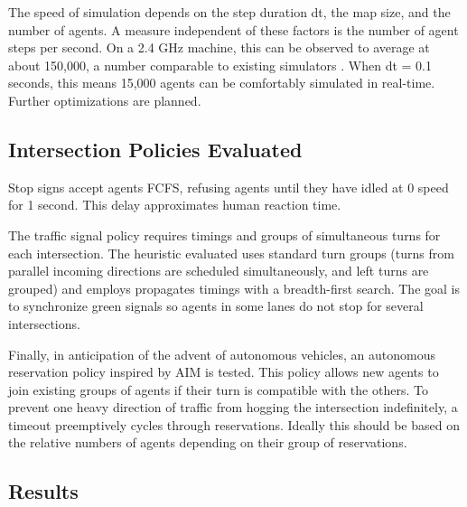 \documentclass[letterpaper, 10 pt, conference]{ieeeconf}  %
\begin{document}
The speed of simulation depends on the step duration dt, the map size, and the
number of agents. A measure independent of these factors is the number of agent
steps per second. On a 2.4 GHz machine, this can be observed to average at about
150,000, a number comparable to existing simulators \cite{SUMOthesis}. When dt
= 0.1 seconds, this means 15,000 agents can be comfortably simulated in
real-time. Further optimizations are planned.

\subsection{Intersection Policies Evaluated}

Stop signs accept agents FCFS, refusing agents until they have idled at 0 speed
for 1 second. This delay approximates human reaction time.

The traffic signal policy requires timings and groups of simultaneous turns for
each intersection. The heuristic evaluated uses standard turn groups (turns from
parallel incoming directions are scheduled simultaneously, and left turns are
grouped) and employs propagates timings with a breadth-first search. The goal is
to synchronize green signals so agents in some lanes do not stop for several
intersections.

Finally, in anticipation of the advent of autonomous vehicles, an autonomous
reservation policy inspired by AIM \cite{JAIR08-dresner} is tested. This policy
allows new agents to join existing groups of agents if their turn is compatible
with the others. To prevent one heavy direction of traffic from hogging the
intersection indefinitely, a timeout preemptively cycles through reservations.
Ideally this should be based on the relative numbers of agents depending on
their group of reservations. 

\subsection{Results}
\end{document}
